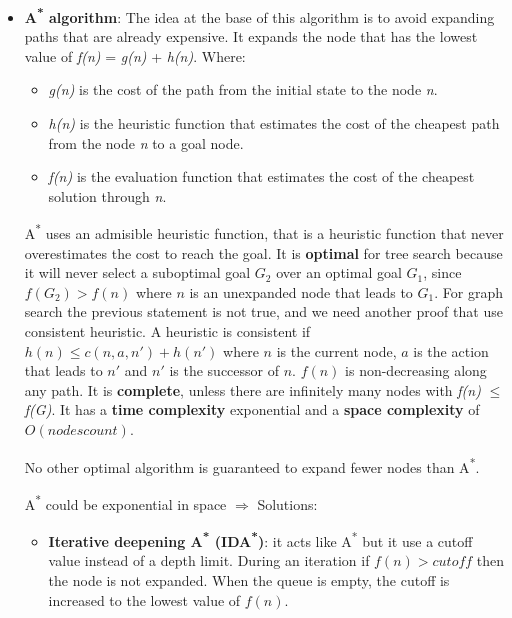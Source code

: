 \documentclass[12pt]{article}
\begin{document}
\begin{enumerate}[label=\textbf{IS.\arabic*}]
\begin{itemize}
        \item \textbf{A\textsuperscript{*} algorithm}: The idea at the base of this algorithm is to avoid expanding paths that are already expensive.
        It expands the node that has the lowest value of \textit{f(n)} = \textit{g(n)} + \textit{h(n)}.
        Where:
        \begin{itemize}
            \item \textit{g(n)} is the cost of the path from the initial state to the node \textit{n}.
            \item \textit{h(n)} is the heuristic function that estimates the cost of the cheapest path from the node \textit{n} to a goal node.
            \item \textit{f(n)} is the evaluation function that estimates the cost of the cheapest solution through \textit{n}.
        \end{itemize}
        A\textsuperscript{*} uses an admisible heuristic function, that is a heuristic function that never overestimates the cost to reach the goal.
        It is \textbf{optimal} for tree search because it will never select a suboptimal goal $G_2$ 
        over an optimal goal $G_1$, since $f(G_2) > f(n)$ where $n$ is an unexpanded node that leads to $G_1$.
        For graph search the previous statement is not true, and we need another proof that use consistent heuristic.
        A heuristic is consistent if $h(n) \leq c(n,a,n') + h(n')$ where $n$ is the current node, $a$ is the action that leads to $n'$ and $n'$ is the successor of $n$.
        $f(n)$ is non-decreasing along any path.
        It is \textbf{complete}, unless there are infinitely many nodes with \textit{f(n)} $\leq$ \textit{f(G)}.
        It has a \textbf{time complexity} exponential and a \textbf{space complexity} of $O(nodescount)$.
        
        No other optimal algorithm is guaranteed to expand fewer nodes than A\textsuperscript{*}.

        A\textsuperscript{*} could be exponential in space $\Rightarrow$ Solutions:
        \begin{itemize}
            \item \textbf{Iterative deepening A\textsuperscript{*} (IDA\textsuperscript{*})}: 
            it acts like A\textsuperscript{*} but it use a cutoff value instead of a depth limit.
            During an iteration if $f(n) > cutoff$ then the node is not expanded.
            When the queue is empty, the cutoff is increased to the lowest value of $f(n)$.


\end{itemize}
\end{itemize}
\end{enumerate}
\end{document}
